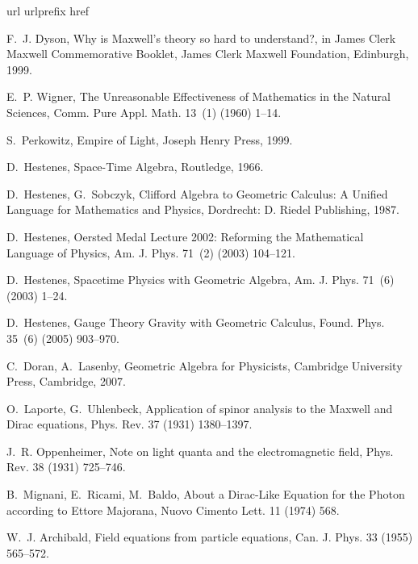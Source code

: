 \documentclass[1p,sort&compress]{elsarticle}
\numberwithin{equation}{section}
\begin{document}

%
\begin{thebibliography}{999}
\expandafter\ifx\csname url\endcsname\relax
  \def\url#1{\texttt{#1}}\fi
\expandafter\ifx\csname urlprefix\endcsname\relax\def\urlprefix{URL }\fi
\expandafter\ifx\csname href\endcsname\relax
  \def\href#1#2{#2} \def\path#1{#1}\fi

F.~J. Dyson, {Why is Maxwell's theory so hard to understand?, in James Clerk
  Maxwell Commemorative Booklet}, James Clerk Maxwell Foundation, Edinburgh,
  1999.

E.~P. Wigner, {The Unreasonable Effectiveness of Mathematics in the Natural
  Sciences}, Comm. Pure Appl. Math. 13~(1) (1960) 1--14.

S.~Perkowitz, {Empire of Light}, Joseph Henry Press, 1999.

D.~Hestenes, {Space-Time Algebra}, Routledge, 1966.

D.~Hestenes, G.~Sobczyk, {Clifford Algebra to Geometric Calculus: A Unified
  Language for Mathematics and Physics}, Dordrecht: D. Riedel Publishing, 1987.

D.~Hestenes, {Oersted Medal Lecture 2002: Reforming the Mathematical Language
  of Physics}, Am. J. Phys. 71~(2) (2003) 104--121.

D.~Hestenes, {Spacetime Physics with Geometric Algebra}, Am. J. Phys. 71~(6)
  (2003) 1--24.

D.~Hestenes, {Gauge Theory Gravity with Geometric Calculus}, Found. Phys.
  35~(6) (2005) 903--970.

C.~Doran, A.~Lasenby, {Geometric Algebra for Physicists}, Cambridge University
  Press, Cambridge, 2007.

O.~Laporte, G.~Uhlenbeck, {Application of spinor analysis to the Maxwell and
  Dirac equations}, Phys. Rev. 37 (1931) 1380--1397.

J.~R. Oppenheimer, {Note on light quanta and the electromagnetic field}, Phys.
  Rev. 38 (1931) 725--746.

B.~Mignani, E.~Ricami, M.~Baldo, {About a Dirac-Like Equation for the Photon
  according to Ettore Majorana}, Nuovo Cimento Lett. 11 (1974) 568.

W.~J. Archibald, {Field equations from particle equations}, Can. J. Phys. 33
  (1955) 565--572.


\end{thebibliography}
\end{document}
